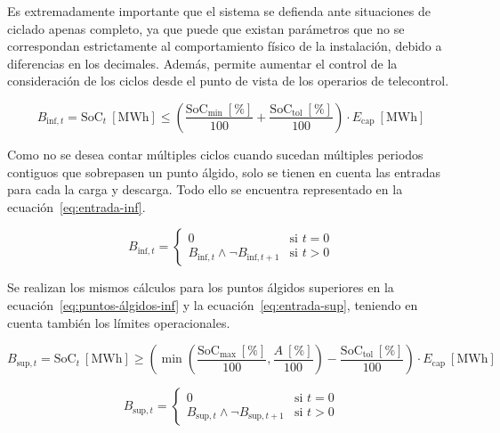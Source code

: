 Es extremadamente importante que el sistema se defienda ante situaciones de ciclado apenas completo, ya que puede que existan parámetros que no se correspondan estrictamente al comportamiento físico de la instalación, debido a diferencias en los decimales. Además, permite aumentar el control de la consideración de los ciclos desde el punto de vista de los operarios de telecontrol.

\begin{equation}
  \label{eq:puntos-álgidos-inf}
  B_{\text{inf}, t} = \mathrm{SoC}_{t}~[\text{MWh}] \le \left( \frac{\mathrm{SoC}_{\text{min}}~[\text{\%}]}{100} + \frac{\mathrm{SoC}_{\text{tol}}~[\text{\%}]}{100} \right) \cdot E_{\text{cap}}~[\text{MWh}]
\end{equation}

Como no se desea contar múltiples ciclos cuando sucedan múltiples periodos contiguos que sobrepasen un punto álgido, solo se tienen en cuenta las entradas para cada la carga y descarga. Todo ello se encuentra representado en la ecuación~\ref{eq:entrada-inf}.

\begin{equation}
  \label{eq:entrada-inf}
  B_{\text{inf}, t} =
  \begin{cases}
    0                                                & \text{si } t = 0\\
    B_{\text{inf}, t} \land \neg B_{\text{inf}, t+1} & \text{si } t > 0
  \end{cases}
\end{equation}

Se realizan los mismos cálculos para los puntos álgidos superiores en la ecuación~\ref{eq:puntos-álgidos-inf} y la ecuación~\ref{eq:entrada-sup}, teniendo en cuenta también los límites operacionales.

\begin{equation}
  \label{eq:puntos-álgidos-sup}
  B_{\text{sup}, t} = \mathrm{SoC}_{t}~[\text{MWh}] \ge \left( \min\left(\frac{\mathrm{SoC}_{\text{max}}~[\text{\%}]}{100}, \frac{A~[\text{\%}]}{100}\right) - \frac{\mathrm{SoC}_{\text{tol}}~[\text{\%}]}{100} \right) \cdot E_{\text{cap}}~[\text{MWh}]
\end{equation}

\begin{equation}
  \label{eq:entrada-sup}
  B_{\text{sup}, t} =
  \begin{cases}
    0                                                & \text{si } t = 0\\
    B_{\text{sup}, t} \land \neg B_{\text{sup}, t+1} & \text{si } t > 0
  \end{cases}
\end{equation}

